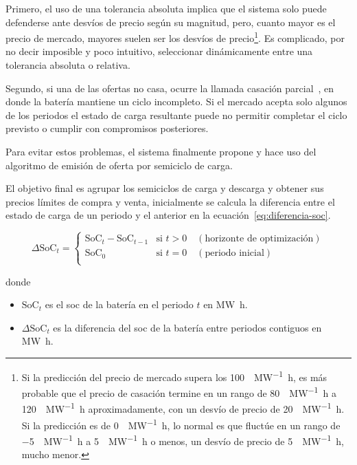 Primero, el uso de una tolerancia absoluta implica que el sistema solo puede defenderse ante desvíos de precio según su magnitud, pero, cuanto mayor es el precio de mercado, mayores suelen ser los desvíos de precio\footnote{Si la predicción del precio de mercado supera los \SI{100}{\text{\euro}\per\mega\watt\hour}, es más probable que el precio de casación termine en un rango de \SI{80}{\text{\euro}\per\mega\watt\hour} a \SI{120}{\text{\euro}\per\mega\watt\hour} aproximadamente, con un desvío de precio de \SI{20}{\text{\euro}\per\mega\watt\hour}. Si la predicción es de \SI{0}{\text{\euro}\per\mega\watt\hour}, lo normal es que fluctúe en un rango de \SI{-5}{\text{\euro}\per\mega\watt\hour} a \SI{5}{\text{\euro}\per\mega\watt\hour} o menos, un desvío de precio de \SI{5}{\text{\euro}\per\mega\watt\hour}, mucho menor.}. Es complicado, por no decir imposible y poco intuitivo, seleccionar dinámicamente entre una tolerancia absoluta o relativa.

Segundo, si una de las ofertas no casa, ocurre la llamada casación parcial~\cite{cnmc2024mercados}, en donde la batería mantiene un ciclo incompleto. Si el mercado acepta solo algunos de los periodos el estado de carga resultante puede no permitir completar el ciclo previsto o cumplir con compromisos posteriores.

Para evitar estos problemas, el sistema finalmente propone y hace uso del algoritmo de emisión de oferta por semiciclo de carga.

El objetivo final es agrupar los semiciclos de carga y descarga y obtener sus precios límites de compra y venta, inicialmente se calcula la diferencia entre el estado de carga de un periodo y el anterior en la ecuación~\ref{eq:diferencia-soc}.

\begin{samepage}

  \begin{equation}
    \label{eq:diferencia-soc}
    \Delta \mathrm{SoC}_{t} =
    \begin{cases}
      \mathrm{SoC}_{t} - \mathrm{SoC}_{t-1} & \text{si } t > 0 \quad (\text{horizonte de optimización}) \\
      \mathrm{SoC}_{0}                      & \text{si } t = 0 \quad (\text{periodo inicial})           \\
    \end{cases}
  \end{equation}

  donde

  \begin{itemize}

    \item \( \mathrm{SoC}_{t} \) es el \gls{soc} de la batería en el periodo \( t \) en \si{{\mega\watt\hour}}.

    \item \( \Delta \mathrm{SoC}_{t} \) es la diferencia del \gls{soc} de la batería entre periodos contiguos en \si{{\mega\watt\hour}}.

  \end{itemize}

\end{samepage}

